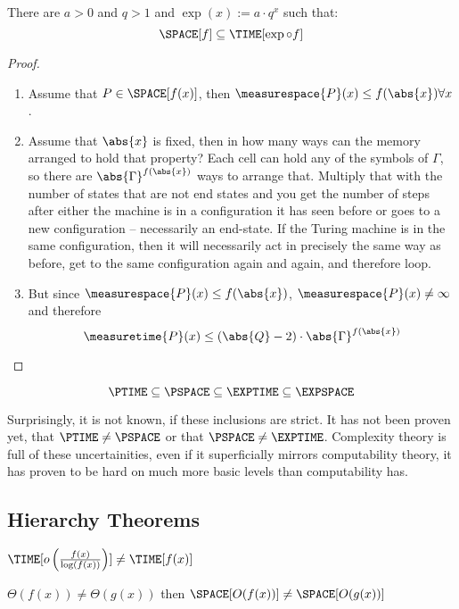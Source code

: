 \begin{theorem}
	There are $a>0$ and $q > 1$ and $\exp(x) := a\cdot q^x$ such that:
	\[\SPACE[f] \subseteq \TIME[\exp\circ f]\]
\end{theorem}
\begin{proof}
	\begin{enumerate}
		\item Assume that $P\in\SPACE[f(x)]$, then $\measurespace{P}(x)\leq f(\abs{x})\forall x$.
		\item Assume that $\abs{x}$ is fixed, then in how many ways can the 
			memory arranged to hold that property? Each cell can hold any of the 
			symbols of $\Gamma$, so there are $\abs{\Gamma}^{f(\abs{x})}$ ways to 
			arrange that. Multiply that with the number of states that are not end 
			states and you get the number of steps after either the machine is in a 
			configuration it has seen before or goes to a new configuration -- 
			necessarily an end-state. If the Turing machine is in the same 
			configuration, then it will necessarily act in precisely the same way 
			as before, get to the same configuration again and again, and therefore loop. 
		\item But since $\measurespace{P}(x)\leq f(\abs{x})$, 
			$\measurespace{P}(x) \neq \infty$ and therefore 
			\[\measuretime{P}(x)\leq (\abs{Q} - 2)\cdot\abs{\Gamma}^{f(\abs{x})}\]
	\end{enumerate}
\end{proof}

\begin{corrolary}
	\[ %
		\PTIME\subseteq\PSPACE\subseteq\EXPTIME\subseteq\EXPSPACE \]
\end{corrolary}

Surprisingly, it is not known, if these inclusions are strict. It has not 
been proven yet, that $\PTIME\neq \PSPACE$ or that $\PSPACE\neq\EXPTIME$. 
Complexity theory is full of these uncertainities, even if it superficially 
mirrors computability theory, it has proven to be hard on much more basic
levels than computability has.

\subsection{Hierarchy Theorems}

\begin{theorem}
	$\TIME[o\left(\frac{f(x)}{\log(f(x))}\right)] \neq \TIME[f(x)]$
\end{theorem}

\begin{theorem}
	$\Theta(f(x)) \neq \Theta(g(x))$ then $\SPACE[O(f(x))] \neq \SPACE[O(g(x))]$
\end{theorem}

